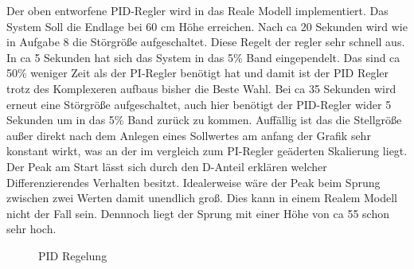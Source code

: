 \documentclass[10pt]{scrartcl}
\begin{document}
Der oben entworfene PID-Regler wird in das Reale Modell implementiert.
Das System Soll die Endlage bei 60 cm Höhe erreichen. Nach ca 20 Sekunden wird wie in Aufgabe 8 die Störgröße aufgeschaltet. Diese Regelt der regler sehr schnell aus. In ca 5 Sekunden hat sich das System in das 5\% Band eingependelt. Das sind ca 50\% weniger Zeit als der PI-Regler benötigt hat und damit ist der PID Regler trotz des Komplexeren aufbaus bisher die Beste Wahl.
Bei ca 35 Sekunden wird erneut eine Störgröße aufgeschaltet, auch hier benötigt der PID-Regler wider 5 Sekunden um in das 5\% Band zurück zu kommen.
Auffällig ist das die Stellgröße außer direkt nach dem Anlegen eines Sollwertes am anfang der Grafik sehr konstant wirkt, was an der im vergleich zum PI-Regler geäderten Skalierung liegt.
Der Peak am Start lässt sich durch den D-Anteil erklären welcher Differenzierendes Verhalten besitzt. Idealerweise wäre der Peak beim Sprung zwischen zwei Werten damit unendlich groß. Dies kann in einem Realem Modell nicht der Fall sein. Dennnoch liegt der Sprung mit einer Höhe von ca 55 schon sehr hoch.
\begin{figure} [H]
\caption{PID Regelung} 
\end{figure}
\newpage
\end{document}
